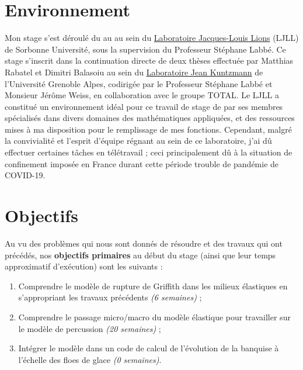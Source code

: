




\section{Environnement}


Mon stage s'est déroulé du  au  au sein du \href{https://www.ljll.math.upmc.fr/en/?lang=fr}{Laboratoire Jacques-Louis Lions} (LJLL) de Sorbonne Université, sous la supervision du Professeur Stéphane Labbé. Ce stage s'inscrit dans la continuation directe de deux thèses effectuée par Matthias Rabatel \Parencite{rabatel2015thesis} et Dimitri Balasoiu \parencite{balasoiu2020halthesis} au sein du \href{https://www-ljk.imag.fr/}{Laboratoire Jean Kuntzmann} de l'Université Grenoble Alpes, codirigée par le Professeur Stéphane Labbé et Monsieur Jérôme Weiss, en collaboration avec le groupe TOTAL. Le LJLL a constitué un environnement idéal pour ce travail de stage de par ses membres spécialisés dans divers domaines des mathématiques appliquées, et des ressources mises à ma disposition pour le remplissage de mes fonctions. Cependant, malgré la convivialité et l'esprit d'équipe régnant au sein de ce laboratoire, j'ai dû effectuer certaines tâches en télétravail ; ceci principalement dû à la situation de confinement imposée en France durant cette période trouble de pandémie de COVID-19.








\section{Objectifs}
\label{sec:introobk}

Au vu des problèmes qui nous sont donnés de résoudre et des travaux qui ont précédés, nos \textbf{objectifs primaires} au début du stage (ainsi que leur temps approximatif d'exécution) sont les suivants :
\begin{enumerate}
    \item Comprendre le modèle de rupture de Griffith dans les milieux élastiques en s'appropriant les travaux précédents \emph{(6 semaines)} ;
    \item Comprendre le passage micro/macro du modèle élastique pour travailler sur le modèle de percussion \emph{(20 semaines)} ; 
    \item Intégrer le modèle dans un code de calcul de l’évolution
    de la banquise à l’échelle des floes de glace \emph{(0 semaines)}.
\end{enumerate}

